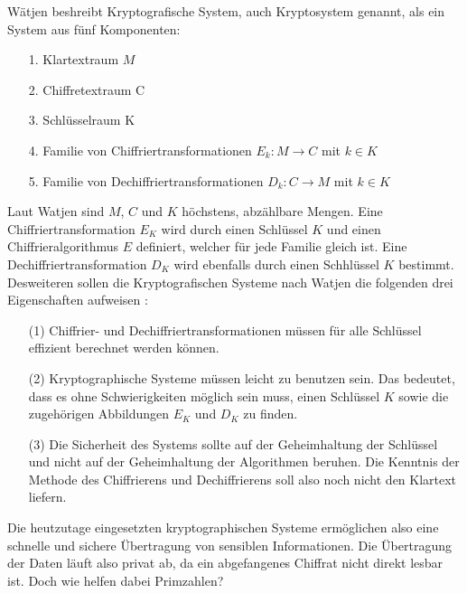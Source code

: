 Wätjen beshreibt Kryptografische System, auch Kryptosystem genannt, als ein System aus fünf Komponenten:

\begin{itemize}
\item[ 1. ]  Klartextraum $M$
\item[ 2. ]  Chiffretextraum C
\item[ 3. ]  Schlüsselraum K
\item[ 4. ]  Familie von Chiffriertransformationen $E_k:M \rightarrow C$ mit $k \in K$
\item[ 5. ]  Familie von Dechiffriertransformationen $D_k:C \rightarrow M$ mit $k \in K$
\end{itemize}

Laut Watjen sind $M$, $C$ und $K$ höchstens, abzählbare Mengen. Eine Chiffriertransformation $E_K$ wird durch einen Schlüssel $K$ und einen Chiffrieralgorithmus $E$ definiert, welcher für jede Familie gleich ist. Eine Dechiffriertransformation $D_K$ wird ebenfalls durch einen Schhlüssel $K$ bestimmt. Desweiteren sollen die Kryptografischen Systeme nach Watjen die folgenden drei Eigenschaften aufweisen \cite[S. 3]{Watjen.2018}:

\begin{itemize}
\item[ (1) ]  Chiffrier- und Dechiffriertransformationen müssen für alle Schlüssel effizient berechnet werden können.
\item[ (2) ]  Kryptographische Systeme müssen leicht zu benutzen sein. Das bedeutet, dass es ohne Schwierigkeiten möglich sein muss, einen Schlüssel $K$ sowie die zugehörigen Abbildungen
$E_K$ und $D_K$ zu finden.
\item[ (3) ]  Die Sicherheit des Systems sollte auf der Geheimhaltung der Schlüssel und nicht
auf der Geheimhaltung der Algorithmen beruhen. Die Kenntnis der Methode des
Chiffrierens und Dechiffrierens soll also noch nicht den Klartext liefern.
\end{itemize}

Die heutzutage eingesetzten kryptographischen Systeme ermöglichen also eine schnelle und sichere Übertragung von sensiblen Informationen. Die Übertragung der Daten läuft also privat ab, da ein abgefangenes Chiffrat nicht direkt lesbar ist. Doch wie helfen dabei Primzahlen?\\


